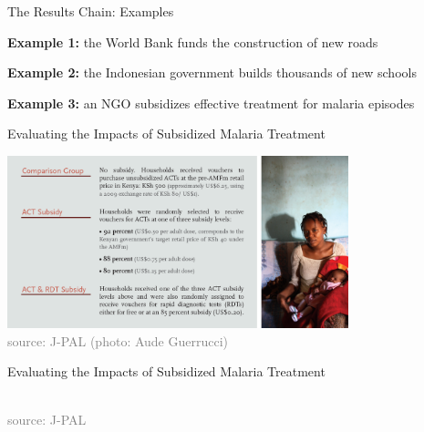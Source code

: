 \documentclass[10pt,xcolor=table,ignorenonframetext,handout,aspectratio=169]{beamer}
\begin{document}

\begin{frame}{The Results Chain:  Examples}

\medskip
\textbf{Example 1:}  the World Bank funds the construction of new roads

\medskip
\medskip

\medskip
\textbf{Example 2:}  the Indonesian government builds thousands of new schools

\medskip
\medskip

\medskip
\textbf{Example 3:}  an NGO subsidizes effective treatment for malaria episodes


\end{frame}




\begin{frame}{Evaluating the Impacts of Subsidized Malaria Treatment}

\medskip
\begin{center}
\includegraphics[height=5cm]{img/JPAL-ACT-desc.png}\\
\textcolor{gray}{\tiny{source:  J-PAL (photo:  Aude Guerrucci)}}
\end{center}

\end{frame}



\begin{frame}{Evaluating the Impacts of Subsidized Malaria Treatment}

\medskip
\begin{center}
	\\
	\textcolor{gray}{\tiny{source:  J-PAL}}
\end{center}

\end{frame}
\end{document}
